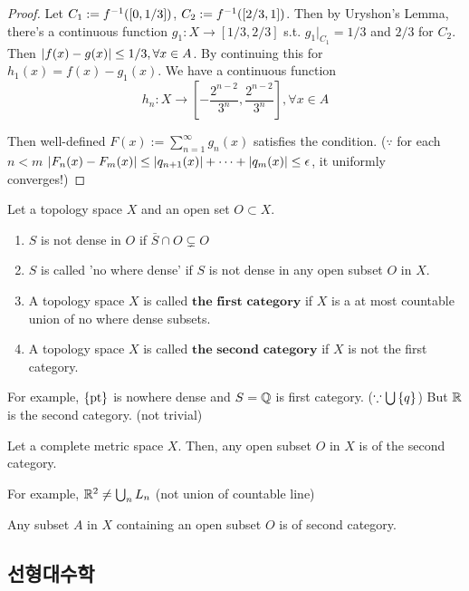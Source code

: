 \documentclass{article}
\begin{document}
\begin{proof}
    Let $C_1 := f^{-1}([0,1/3])$, $C_2 := f^{-1}([2/3,1])$. Then by Uryshon's Lemma, there's a continuous function $g_1: X \to [1/3,2/3]$ s.t. $g_1|_{C_1} = 1/3$ and $2/3$ for $C_2$. Then $\lvert f(x)-g(x)\rvert \leq 1/3, \forall x \in A$. By continuing this for $h_1(x)=f(x)-g_1(x)$. We have a continuous function
    \[h_n : X \to [-\frac{2^{n-2}}{3^n}, \frac{2^{n-2}}{3^n}], \forall x \in A\]

    Then well-defined $F(x) := \sum^\infty_{n=1} g_n(x)$ satisfies the condition. ($\because$ for each $n<m$ $\lvert F_n(x)-F_m(x)\rvert \leq \lvert q_{n+1}(x)\rvert+\cdots+\lvert q_m(x)\rvert\leq \epsilon$, it uniformly converges!)
\end{proof}

\begin{definition}
    Let a topology space $X$ and an open set $O \subset X$.
    \begin{enumerate}
        \item $S$ is not dense in $O$ if $\bar{S} \cap O \subsetneq O$
        \item $S$ is called 'no where dense' if $S$ is not dense in any open subset $O$ in $X$.
        \item A topology space $X$ is called $\textbf{the first category}$ if $X$ is a at most countable union of no where dense subsets.
        \item A topology space $X$ is called $\textbf{the second category}$ if $X$ is not the first category.
    \end{enumerate}
\end{definition}

For example, $\left\{ \text{pt} \right\}$ is nowhere dense and $S=\mathbb{Q}$ is first category. ($\because \bigcup \left\{ q \right\}$) But $\mathbb{R}$ is the second category. (not trivial)

\begin{theorem}
    Let a complete metric space $X$. Then, any open subset $O$ in $X$ is of the second category.
    \label{theorem:Baire_category}
\end{theorem}

For example, $\mathbb{R}^2 \neq \bigcup_n L_n$ (not union of countable line)

\begin{corollary}
    Any subset $A$ in $X$ containing an open subset $O$ is of second category.
\end{corollary}

\subsection{선형대수학}
\end{document}
